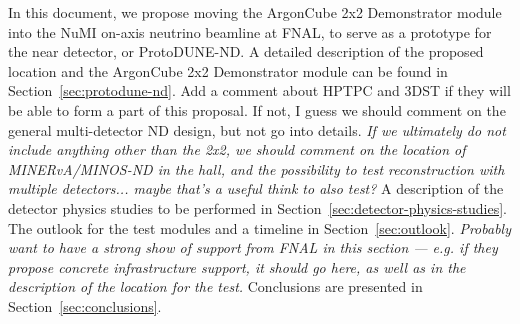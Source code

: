In this document, we propose moving the ArgonCube 2x2 Demonstrator module into the NuMI on-axis neutrino beamline at FNAL, to serve as a prototype for the near detector, or ProtoDUNE-ND. A detailed description of the proposed location and the ArgonCube 2x2 Demonstrator module can be found in Section~\ref{sec:protodune-nd}. Add a comment about HPTPC and 3DST if they will be able to form a part of this proposal. If not, I guess we should comment on the general multi-detector ND design, but not go into details. {\it If we ultimately do not include anything other than the 2x2, we should comment on the location of MINERvA/MINOS-ND in the hall, and the possibility to test reconstruction with multiple detectors... maybe that's a useful think to also test?} A description of the detector physics studies to be performed in Section~\ref{sec:detector-physics-studies}. The outlook for the test modules and a timeline in Section~\ref{sec:outlook}. {\it Probably want to have a strong show of support from FNAL in this section --- e.g. if they propose concrete infrastructure support, it should go here, as well as in the description of the location for the test.} Conclusions are presented in Section~\ref{sec:conclusions}.\\\\


